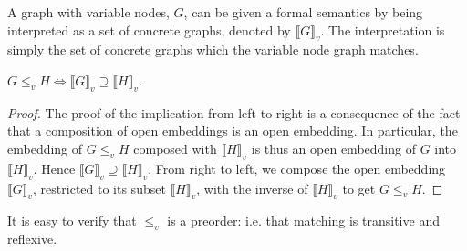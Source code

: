 \documentclass[runningheads]{llncs}
\newcommand{\tensor}{\otimes}
\newcommand{\vinterp}[1]{\llbracket #1 \rrbracket_v}
\begin{document}
A graph with variable nodes, $G$, can be given a formal semantics by
being interpreted as a set of concrete graphs, denoted by
$\vinterp{G}$. The interpretation is simply the set of concrete graphs
which the variable node graph matches. 

\begin{proposition}
\label{match-interp-thm}
$G \leq_v H \Leftrightarrow \vinterp{G} \supseteq \vinterp{H}$.
\end{proposition}
\begin{proof}
  The proof of the implication from left to right is a consequence of
  the fact that a composition of open embeddings is an open embedding.
  In particular, the embedding of $G \leq_v H$ composed with
  $\vinterp{H}$ is thus an open embedding of $G$ into $\vinterp{H}$.
  Hence $\vinterp{G} \supseteq \vinterp{H}$. From right to left, we
  compose the open embedding $\vinterp{G}$, restricted to its subset
  $\vinterp{H}$, with the inverse of $\vinterp{H}$ to get $G \leq_v
  H$.
\end{proof}

It is easy to verify that $\leq_v$ is a preorder: i.e. that
matching is transitive and reflexive.



\end{document}
